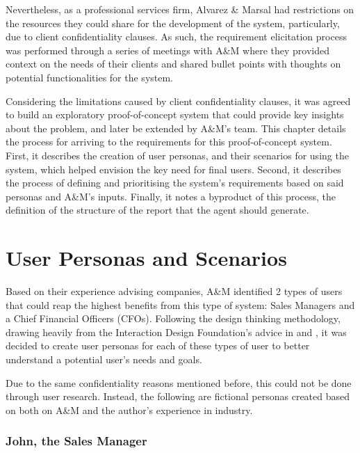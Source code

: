 \documentclass[a4paper]{report}
\begin{document}
Nevertheless, as a professional services firm, Alvarez \& Marsal had restrictions on the resources they could share for the development of the system, particularly, due to client confidentiality clauses. As such, the requirement elicitation process was performed through a series of meetings with A\&M where they provided context on the needs of their clients and shared bullet points with thoughts on potential functionalities for the system.

Considering the limitations caused by client confidentiality clauses, it was agreed to build an exploratory proof-of-concept system that could provide key insights about the problem, and later be extended by A\&M's team. This chapter details the process for arriving to the requirements for this proof-of-concept system. First, it describes the creation of user personas, and their scenarios for using the system, which helped envision the key need for final users. Second, it describes the process of defining and prioritising the system's requirements based on said personas and A\&M's inputs. Finally, it notes a byproduct of this process, the definition of the structure of the report that the agent should generate.

\section{User Personas and Scenarios}

Based on their experience advising companies, A\&M identified 2 types of users that could reap the highest benefits from this type of system: Sales Managers and a Chief Financial Officers (CFOs). Following the design thinking methodology, drawing heavily from the Interaction Design Foundation's advice in \cite{ixdf_personas_2025} and \cite{ixdf_user_scenarios_2025}, it was decided to create user personas for each of these types of user to better understand a potential user's needs and goals.

Due to the same confidentiality reasons mentioned before, this could not be done through user research. Instead, the following are fictional personas created based on both on A\&M and the author's experience in industry.

\subsubsection{John, the Sales Manager}
\end{document}
